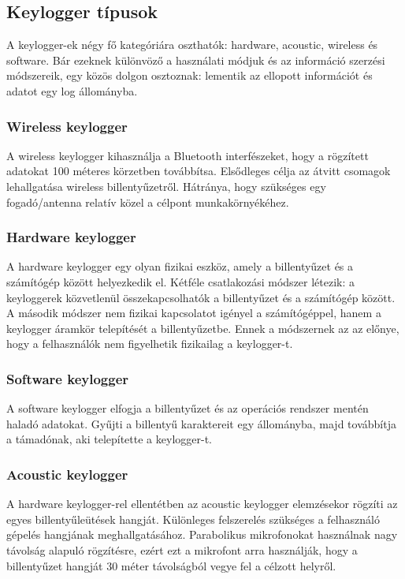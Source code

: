 \documentclass[a4paper, 11pt]{article}
\begin{document}
\subsection{Keylogger típusok}
A keylogger-ek négy fő kategóriára oszthatók: hardware, acoustic, wireless és software. Bár ezeknek különvöző a használati módjuk és az információ szerzési módszereik, egy közös dolgon osztoznak: lementik az ellopott információt és adatot egy log állományba.

\subsubsection{Wireless keylogger}
A wireless keylogger kihasználja a Bluetooth interfészeket, hogy a rögzített adatokat 100 méteres körzetben továbbítsa. Elsődleges célja az átvitt csomagok lehallgatása wireless billentyűzetről. Hátránya, hogy szükséges egy fogadó/antenna relatív közel a célpont munkakörnyékéhez.

\subsubsection{Hardware keylogger}
A hardware keylogger egy olyan fizikai eszköz, amely a billentyűzet és a számítógép között helyezkedik el. Kétféle csatlakozási módszer létezik: a keyloggerek közvetlenül összekapcsolhatók a billentyűzet és a számítógép között. A második módszer nem fizikai kapcsolatot igényel a számítógéppel, hanem a keylogger áramkör telepítését a billentyűzetbe. Ennek a módszernek az az előnye, hogy a felhasználók nem figyelhetik fizikailag a keylogger-t.

\subsubsection{Software keylogger}
A software keylogger elfogja a billentyűzet és az operációs rendszer mentén haladó adatokat. Gyűjti a billentyű karaktereit egy állományba, majd továbbítja a támadónak, aki telepítette a keylogger-t.

\subsubsection{Acoustic keylogger}
A hardware keylogger-rel ellentétben az acoustic keylogger elemzésekor rögzíti az egyes billentyűleütések hangját. Különleges felszerelés szükséges a felhasználó gépelés hangjának meghallgatásához. Parabolikus mikrofonokat használnak nagy távolság alapuló rögzítésre, ezért ezt a mikrofont arra használják, hogy a billentyűzet hangját 30 méter távolságból vegye fel a célzott helyről.
\end{document}
